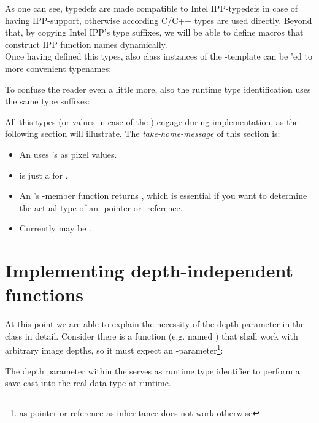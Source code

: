 As one can see, typedefs are made compatible to Intel IPP-typedefs in case of having IPP-support, otherwise according C/C++ types are used directly. Beyond that, by copying Intel IPP's type suffixes, we will be able to define macros that construct IPP function names dynamically.\\ Once having defined this types, also class instances of the -template can be 'ed to more convenient typenames:


To confuse the reader even a little more, also the runtime type identification  uses the same type suffixes:


All this types (or values in case of the ) engage during implementation, as the following section will illustrate. The \emph{take-home-message} of this section is:\\
\begin{itemize}
\item An  uses 's as pixel values.
\item {} is just a  for .
\item An 's -member function returns , which is essential if you want to determine the actual type of an -pointer or -reference.
\item Currently  may be .
\end{itemize}


\section{Implementing depth-independent functions}

At this point we are able to explain the necessity of the depth parameter in the  class in detail. Consider there is a function (e.g. named ) that shall work with arbitrary image depths, so it must expect an -parameter\footnote{as pointer or reference as inheritance does not work otherwise}:


The depth parameter within the  serves as runtime type identifier to perform a save cast into the real data type at runtime.

